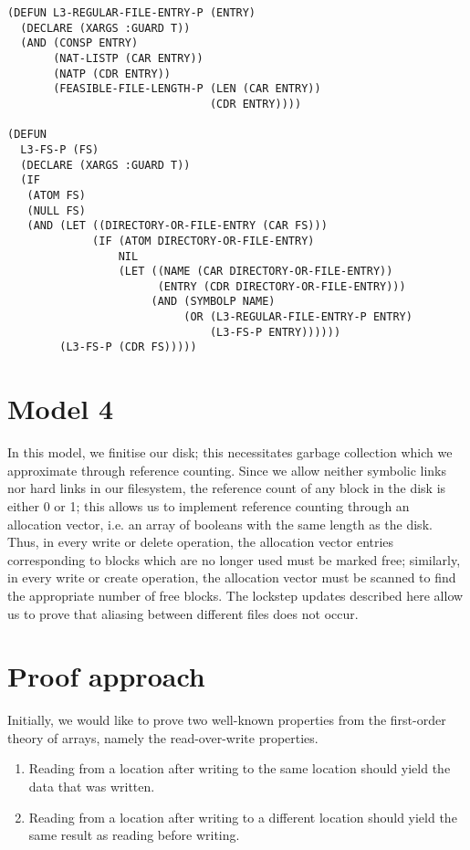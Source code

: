 \documentclass[format=sigconf,review=true]{acmart}
\begin{document}
\begin{lstlisting}
(DEFUN L3-REGULAR-FILE-ENTRY-P (ENTRY)
  (DECLARE (XARGS :GUARD T))
  (AND (CONSP ENTRY)
       (NAT-LISTP (CAR ENTRY))
       (NATP (CDR ENTRY))
       (FEASIBLE-FILE-LENGTH-P (LEN (CAR ENTRY))
                               (CDR ENTRY))))

(DEFUN
  L3-FS-P (FS)
  (DECLARE (XARGS :GUARD T))
  (IF
   (ATOM FS)
   (NULL FS)
   (AND (LET ((DIRECTORY-OR-FILE-ENTRY (CAR FS)))
             (IF (ATOM DIRECTORY-OR-FILE-ENTRY)
                 NIL
                 (LET ((NAME (CAR DIRECTORY-OR-FILE-ENTRY))
                       (ENTRY (CDR DIRECTORY-OR-FILE-ENTRY)))
                      (AND (SYMBOLP NAME)
                           (OR (L3-REGULAR-FILE-ENTRY-P ENTRY)
                               (L3-FS-P ENTRY))))))
        (L3-FS-P (CDR FS)))))
\end{lstlisting}

\section{Model 4}
In this model, we finitise our disk; this necessitates garbage
collection which we approximate through reference
counting. Since we allow neither symbolic links nor hard links in our
filesystem, the reference count of any block in the disk is either 0
or 1; this allows us to implement reference counting through an
allocation vector, i.e. an array of booleans with the same length as
the disk. Thus, in every write or delete operation, the allocation
vector entries corresponding to blocks which are no longer used must
be marked free; similarly, in every write or create operation, the
allocation vector must be scanned to find the appropriate number of
free blocks. The lockstep updates described here allow us to prove
that aliasing between different files does not occur.

\section {Proof approach}

Initially, we would like to prove two well-known properties from the
first-order theory of arrays, namely the read-over-write properties.

\begin {enumerate}
\item Reading from a location after writing to the same location
  should yield the data that was written.
\item Reading from a location after writing to a different
  location should yield the same result as reading before writing.
\end {enumerate}
\end{document}
